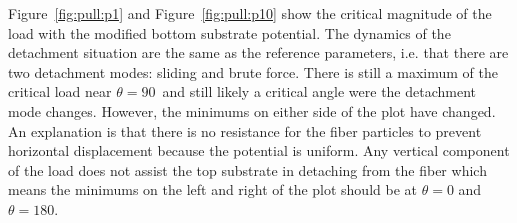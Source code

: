 Figure~\ref{fig:pull:p1} and Figure~\ref{fig:pull:p10} show the critical magnitude of the load with the modified bottom substrate potential. The dynamics of the detachment situation are the same as the reference parameters, i.e. that there are two detachment modes: sliding and brute force. There is still a maximum of the critical load near $\theta=90$\textdegree ~and still likely a critical angle were the detachment mode changes. However, the minimums on either side of the plot have changed. An explanation is that there is no resistance for the fiber particles to prevent horizontal displacement because the potential is uniform. Any vertical component of the load does not assist the top substrate in detaching from the fiber which means the minimums on the left and right of the plot should be at $\theta=0$ and $\theta=180$.